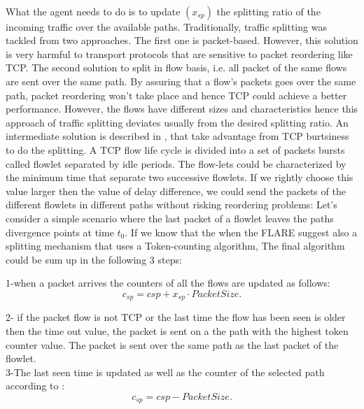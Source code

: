 \\ What the agent needs to do is to update $(x_{sp})$ the splitting ratio of the incoming traffic over the available paths. Traditionally, traffic splitting was tackled from two approaches. The first one is packet-based. However, this solution is very harmful to transport protocols that are sensitive to packet reordering like TCP. The second solution to split in flow basis, i.e. all packet of the same flows are sent over the same path. By assuring that a flow's packets goes over the same path, packet reordering won't take place and hence TCP could achieve a better performance. However, the flows have different sizes and characteristics hence this approach of traffic splitting deviates usually from the desired splitting ratio. An intermediate solution is described in \cite {sin1}, that take advantage from TCP burtsiness to do the splitting. A TCP flow life cycle is divided into a set of packets bursts called flowlet separated by idle periods. The flow-lets could be characterized by the minimum time that separate two successive flowlets. If we rightly choose this value larger then the value of delay difference, we could send the packets of the different flowlets in different paths without risking reordering problems: Let's consider a simple scenario where the last packet of a flowlet leaves the paths divergence points at time $t_0$. If we know that the when the 
FLARE suggest also a splitting mechanism that uses a Token-counting algorithm, 
The final algorithm could be sum up in the following 3 steps:

1-when a packet arrives the counters of all the flows are updated as follows:
\begin{equation}
c_{sp} = c{sp} + x_{sp} \cdot PacketSize.
\end{equation}

2- if the packet flow is not TCP or the last time the flow has been seen is older then the time out value, the packet is sent on a the path with the highest token counter value. The packet is sent over the same path as the last packet of the flowlet.\\

3-The last seen time is updated as well as the counter of the selected path according to :
\begin{equation}
c_{sp} = c{sp} - PacketSize.
\end{equation}
